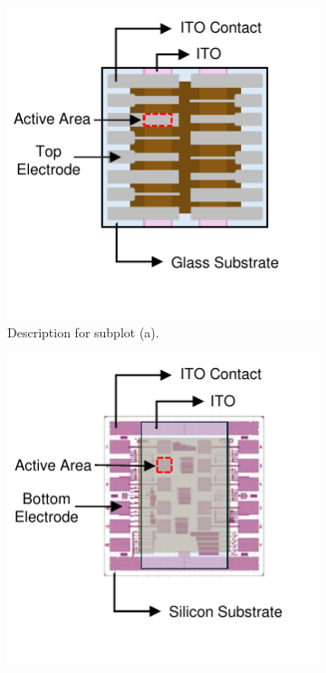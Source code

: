 \begin{figure}[htbp]
    \centering
    \begin{subfigure}[t]{0.49\textwidth} %
        \centering
        \includegraphics[width=\textwidth]{chapters/material_properties/images/Glass_Substrate.pdf} %
        \caption{Description for subplot (a).}
        \label{fig:sub-a}
    \end{subfigure}
    \hfill %
    \begin{subfigure}[t]{0.49\textwidth} %
        \centering
        \includegraphics[width=\textwidth]{chapters/material_properties/images/PIX_Substrate.pdf} %

\end{subfigure}
\end{figure}
